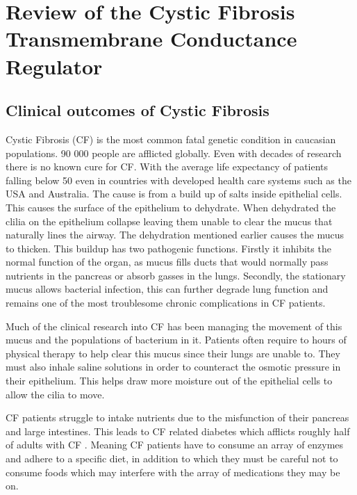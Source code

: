 \chapter{Review of the Cystic Fibrosis Transmembrane Conductance Regulator}
\label{chap:cftr_review}
\newpage
\section{Clinical outcomes of Cystic Fibrosis}
Cystic Fibrosis (CF) is the most common fatal genetic condition in caucasian populations. 90 000 people are afflicted globally. Even with decades of research there is no known cure for CF. With the average life expectancy of patients falling below 50 even in countries with developed health care systems such as the USA and Australia\cite{}\cite{}. The cause is from a build up of salts inside epithelial cells. This causes the surface of the epithelium to dehydrate. When dehydrated the clilia on the epithelium collapse leaving them unable to clear the mucus that naturally lines the airway\cite{boucher2006}. The dehydration mentioned earlier causes the mucus to thicken. This buildup has two pathogenic functions. Firstly it inhibits the normal function of the organ, as mucus fills ducts that would normally pass nutrients in the pancreas or absorb gasses in the lungs. Secondly, the stationary mucus allows bacterial infection, this can further degrade lung function and remains one of the most troublesome chronic complications in CF patients. 

Much of the clinical research into CF has been managing the movement of this mucus and the populations of bacterium in it. Patients often require to hours of physical therapy to help clear this mucus since their lungs are unable to. They must also inhale saline solutions in order to counteract the osmotic pressure in their epithelium. This helps draw more moisture out of the epithelial cells to allow the cilia to move. 

CF patients struggle to intake nutrients due to the misfunction of their pancreas and large intestines. This leads to CF related diabetes which afflicts roughly half of adults with CF \cite{kayani2018}. Meaning CF patients have to consume an array of enzymes and adhere to a specific diet, in addition to which they must be careful not to consume foods which may interfere with the array of medications they may be on.

